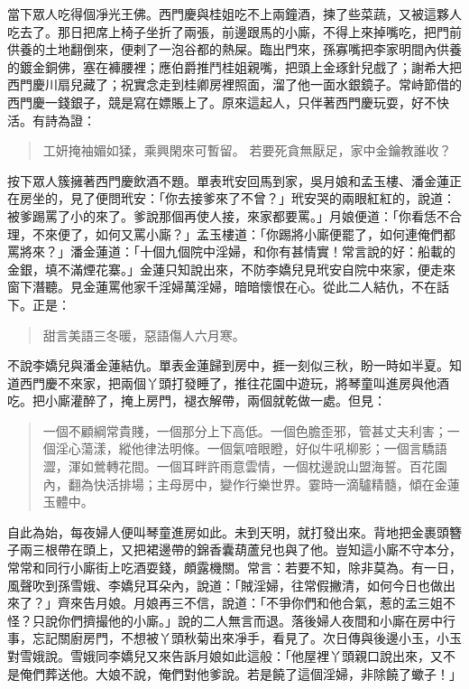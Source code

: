當下眾人吃得個凈光王佛。西門慶與桂姐吃不上兩鐘酒，揀了些菜蔬，又被這夥人吃去了。那日把席上椅子坐折了兩張，前邊跟馬的小廝，不得上來掉嘴吃，把門前供養的土地翻倒來，便剌了一泡谷都的熱屎。臨出門來，孫寡嘴把李家明間內供養的鍍金銅佛，塞在褲腰裡；應伯爵推鬥桂姐親嘴，把頭上金琢針兒戲了；謝希大把西門慶川扇兒藏了；祝實念走到桂卿房裡照面，溜了他一面水銀鏡子。常峙節借的西門慶一錢銀子，競是寫在嫖賬上了。原來這起人，只伴著西門慶玩耍，好不快活。有詩為證：
\begin{quote}
工妍掩袖媚如猱，乘興閑來可暫留。
若要死貪無厭足，家中金鑰教誰收？
\end{quote}

按下眾人簇擁著西門慶飲酒不題。單表玳安回馬到家，吳月娘和孟玉樓、潘金蓮正在房坐的，見了便問玳安：「你去接爹來了不曾？」玳安哭的兩眼紅紅的，說道：被爹踢罵了小的來了。爹說那個再使人接，來家都要罵。」月娘便道：「你看恁不合理，不來便了，如何又罵小廝？」孟玉樓道：「你踢將小廝便罷了，如何連俺們都罵將來？」潘金蓮道：「十個九個院中淫婦，和你有甚情實！常言說的好：船載的金銀，填不滿煙花寨。」金蓮只知說出來，不防李嬌兒見玳安自院中來家，便走來窗下潛聽。見金蓮罵他家千淫婦萬淫婦，暗暗懷恨在心。從此二人結仇，不在話下。正是：
\begin{quote}
甜言美語三冬暖，惡語傷人六月寒。
\end{quote}

不說李嬌兒與潘金蓮結仇。單表金蓮歸到房中，捱一刻似三秋，盼一時如半夏。知道西門慶不來家，把兩個丫頭打發睡了，推往花園中遊玩，將琴童叫進房與他酒吃。把小廝灌醉了，掩上房門，褪衣解帶，兩個就乾做一處。但見：
\begin{quote}
一個不顧綱常貴賤，一個那分上下高低。一個色膽歪邪，管甚丈夫利害；一個淫心蕩漾，縱他律法明條。一個氣喑眼瞪，好似牛吼柳影；一個言驕語澀，渾如鶯轉花間。一個耳畔許雨意雲情，一個枕邊說山盟海誓。百花園內，翻為快活排場；主母房中，變作行樂世界。霎時一滴驢精髓，傾在金蓮玉體中。
\end{quote}

自此為始，每夜婦人便叫琴童進房如此。未到天明，就打發出來。背地把金裹頭簪子兩三根帶在頭上，又把裙邊帶的錦香囊葫蘆兒也與了他。豈知這小廝不守本分，常常和同行小廝街上吃酒耍錢，頗露機關。常言：若要不知，除非莫為。有一日，風聲吹到孫雪娥、李嬌兒耳朵內，說道：「賊淫婦，往常假撇清，如何今日也做出來了？」齊來告月娘。月娘再三不信，說道：「不爭你們和他合氣，惹的孟三姐不怪？只說你們擠撮他的小廝。」說的二人無言而退。落後婦人夜間和小廝在房中行事，忘記關廚房門，不想被丫頭秋菊出來凈手，看見了。次日傳與後邊小玉，小玉對雪娥說。雪娥同李嬌兒又來告訴月娘如此這般：「他屋裡丫頭親口說出來，又不是俺們葬送他。大娘不說，俺們對他爹說。若是饒了這個淫婦，非除饒了蠍子！」

